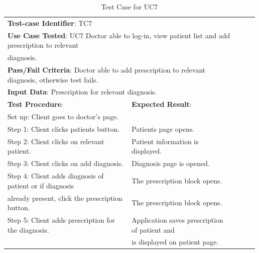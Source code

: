 \documentclass[a4paper]{article}
\begin{document}
\FloatBarrier

\begin{table}[h!]
\centering
\caption*{Test Case for UC7}
\label{TC7}
\begin{tabular}{lllll}
\cline{1-2}

\multicolumn{2}{|l|}{\textbf{Test-case Identifier}: TC7}  &  &  &  \\

\multicolumn{2}{|l|}{\textbf{Use Case Tested}: UC7 Doctor able to log-in, view patient list and add prescription to relevant}  &  &  &  \\

\multicolumn{2}{|l|}{diagnosis.}  &  &  &  \\

\multicolumn{2}{|l|}{\textbf{Pass/Fail Criteria}: Doctor able to add prescription to relevant diagnosis, otherwise test fails.}  &  &  &  \\

\multicolumn{2}{|l|}{\textbf{Input Data}: Prescription for relevant diagnosis.}  &  &  &  \\

\cline{1-2}

\multicolumn{1}{|l|}{\textbf{Test Procedure}:} & \multicolumn{1}{l|}{\textbf{Expected Result}:} &  &  &  \\ 

\cline{1-2}

\multicolumn{1}{|l|}{Set up: Client goes to doctor's page.} & \multicolumn{1}{l|}{} &  &  &  \\

\multicolumn{1}{|l|}{Step 1: Client clicks patients button.} & \multicolumn{1}{l|}{Patients page opens.} &  &  &  \\

\multicolumn{1}{|l|}{Step 2: Client clicks on relevant patient.} & \multicolumn{1}{l|}{Patient information is displayed.} &  &  &  \\

\multicolumn{1}{|l|}{Step 3: Client clicks on add diagnosis.} & \multicolumn{1}{l|}{Diagnosis page is opened.} &  &  &  \\

\multicolumn{1}{|l|}{Step 4: Client adds diagnosis of patient or if diagnosis} & \multicolumn{1}{l|}{The prescription block opens.} &  &  &  \\

\multicolumn{1}{|l|}{already present, click the prescription button.} & \multicolumn{1}{l|}{The prescription block opens.} &  &  &  \\

\multicolumn{1}{|l|}{Step 5: Client adds prescription for the diagnosis.} & \multicolumn{1}{l|}{Application saves prescription of patient and} &  &  &  \\

\multicolumn{1}{|l|}{} & \multicolumn{1}{l|}{is displayed on patient page.} &  &  &  \\

\cline{1-2}

\end{tabular}
\end{table}

\FloatBarrier
\end{document}
